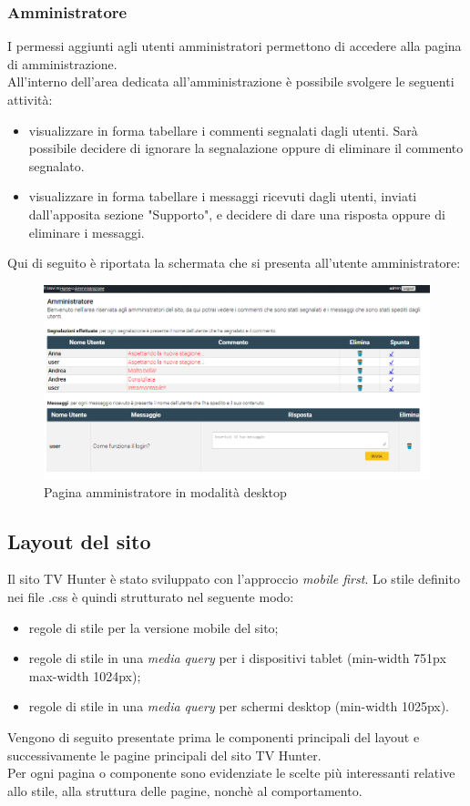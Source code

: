 \subsubsection{Amministratore}
I permessi aggiunti agli utenti amministratori permettono di accedere alla pagina di amministrazione.\\
All'interno dell'area dedicata all'amministrazione è possibile svolgere le seguenti attività:
\begin{itemize}
	\item visualizzare in forma tabellare i commenti segnalati dagli utenti. Sarà possibile decidere di ignorare la segnalazione oppure di eliminare il commento segnalato.
	\item visualizzare in forma tabellare i messaggi ricevuti dagli utenti, inviati dall'apposita sezione "Supporto", e decidere di dare una risposta oppure di eliminare i messaggi.
\end{itemize}
Qui di seguito è riportata la schermata che si presenta all'utente amministratore:
\begin{figure}[h!]
	\centerline{\includegraphics[scale=0.45]{img/amministratore.png}}
	\caption{Pagina amministratore in modalità desktop}
	\label{fig:navbarGU}
\end{figure}


\subsection{Layout del sito}
Il sito TV Hunter è stato sviluppato con l'approccio \textit{mobile first}. Lo stile definito nei file .css è quindi strutturato nel seguente modo:
\begin{itemize}
	\item regole di stile per la versione mobile del sito;
	\item regole di stile in una \textit{media query} per i dispositivi tablet (min-width 751px max-width 1024px);
	\item regole di stile in una \textit{media query} per schermi desktop (min-width 1025px).
\end{itemize}
Vengono di seguito presentate prima le componenti principali del layout e successivamente le pagine principali del sito TV Hunter. \\
Per ogni pagina o componente sono evidenziate le scelte più interessanti relative allo stile, alla struttura delle pagine, nonchè al comportamento.

